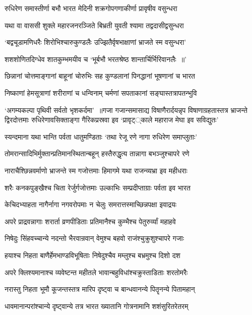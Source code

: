 \twolineshloka
{रुधिरेण समास्तीर्णा बभौ भारत मेदिनी}
{शक्रगोपगणाकीर्णा प्रावृषीव वसुन्धरा}


\twolineshloka
{यथा वा वाससी शुक्ले महारजनरञ्जिते}
{बिभ्रती युवती श्यामा तद्वदासीद्वसुन्धरा}


\twolineshloka
{`बद्वचूडामणिधरैः शिरोभिश्चारुकुण्डलैः}
{उज्झितैर्वृषभाक्षाणां भ्राजते स्म वसुन्धरा'}


\twolineshloka
{शशशोणितदिग्धेव शातकुम्भमयीव च}
{`भूर्बभौ भरतश्रेष्ठ शान्तार्चिर्भिरिवानलैः ॥'}


\twolineshloka
{छिन्नानां चोत्तमाङ्गानां बाहूनां चोरुभिः सह}
{कुण्डलानां पिनद्धानां भूषणानां च भारत}


\threelineshloka
{निष्काणां हेमसूत्राणां शरीराणां च धन्विनाम्}
{चर्मणां सपताकानां सङ्घास्तत्रापतन्भुवि}
{}


\fourlineindentedshloka
{`अगम्यकल्पा पृथिवी सर्वतो भृशकर्दमा' ॥गजा गजान्समासाद्य विषाणैरार्दयन्नृप}
{विषाणाग्रहतास्तत्र भ्राजन्ते द्विरदोत्तमाः}
{रुधिरेणावसिक्ताङ्गा गैरिकप्रस्रवा इव}
{`प्रावृट््काले महाराज मेघा इव सविद्युतः'}


\twolineshloka
{स्यन्दमाना यथा भान्ति पर्वता धातुमण्डिताः}
{`तथा रेजू रणे नागा रुधिरेण समाप्लुताः'}


\twolineshloka
{तोमरान्सादिभिर्मुक्तान्प्रतिमानस्थितान्बहून्}
{हस्तैरुद्धृत्य तान्नागा बभञ्जुश्चापरे रणे}


\twolineshloka
{नाराचैश्छिन्नवर्माणो भ्राजन्ते स्म गजोत्तमाः}
{हिमागमे यथा राजन्व्यभ्रा इव महीधराः}


\twolineshloka
{शरैः कनकपुङ्खैश्च चिता रेर्जुर्गजोत्तमाः}
{उल्काभिः सम्प्रदीप्ताग्राः पर्वता इव भारत}


\twolineshloka
{केचिदभ्याहता नागैर्नागा नगवरोपमाः}
{न चेलुः समरात्तस्माच्छिन्नपक्षा इवाद्रयः}


\twolineshloka
{अपरे प्राद्रवन्नागाः शरार्ता व्रणपीडिताः}
{प्रतिमानैश्च कुम्भैश्च पेतुरुर्व्यां महाहवे}


\twolineshloka
{निषेदुः सिंहवच्चान्ये नदन्तो भैरवान्रवान्}
{वेमुश्च बहवो राजंश्चुक्रुशुश्चापरे गजाः}


\twolineshloka
{हयाश्च निहता बाणैर्हेमभाण्डविभूषिताः}
{निषेदुश्चैव मम्लुश्च बभ्रमुश्च दिशो दश}


\twolineshloka
{अपरे क्लिश्यमानाश्च व्यवेष्टन्त महीतले}
{भावान्बहुविधांश्चक्रुस्ताडिताः शरतोमरैः}


\twolineshloka
{नरास्तु निहता भूमौ कूजन्तस्तत्र मारिप}
{दृष्ट्वा च बान्धवानन्ये पितॄनन्ये पितामहान्}


\twolineshloka
{धावमानान्परांश्चान्ये दृष्ट्वान्ये तत्र भारत}
{ख्यातानि गोत्रनामानि शशंसुरितरेतरम्}


